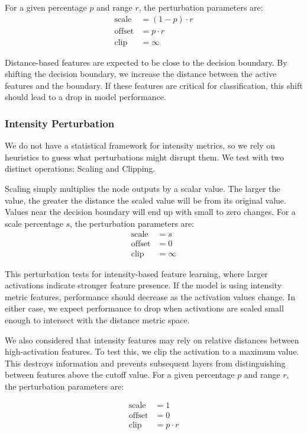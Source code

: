 For a given percentage $p$ and range $r$, the perturbation parameters are:
\begin{align}
    \text{scale} &= (1 - p) \cdot r \\
    \text{offset} &= p \cdot r \\
    \text{clip} &= \infty
\end{align}

Distance-based features are expected to be close to the decision boundary. By shifting the decision boundary, we increase the distance between the active features and the boundary. If these features are critical for classification, this shift should lead to a drop in model performance.


\subsubsection{Intensity Perturbation}
We do not have a statistical framework for intensity metrics, so we rely on heuristics to guess what perturbations might disrupt them. We test with two distinct operations: Scaling and Clipping.

Scaling simply multiplies the node outputs by a scalar value. The larger the value, the greater the distance the scaled value will be from its original value. Values near the decision boundary will end up with small to zero changes. For a scale percentage $s$, the perturbation parameters are:
\begin{align}
    \text{scale} &= s \\
    \text{offset} &= 0 \\
    \text{clip} &= \infty
\end{align}

This perturbation tests for intensity-based feature learning, where larger activations indicate stronger feature presence. If the model is using intensity metric features, performance should decrease as the activation values change. In either case, we expect performance to drop when activations are scaled small enough to intersect with the distance metric space.

We also considered that intensity features may rely on relative distances between high-activation features. To test this, we clip the activation to a maximum value. This destroys information and prevents subsequent layers from distinguishing between features above the cutoff value. For a given percentage $p$ and range $r$, the perturbation parameters are:

\begin{align}
    \text{scale} &= 1 \\
    \text{offset} &= 0 \\
    \text{clip} &= p \cdot r
\end{align}

